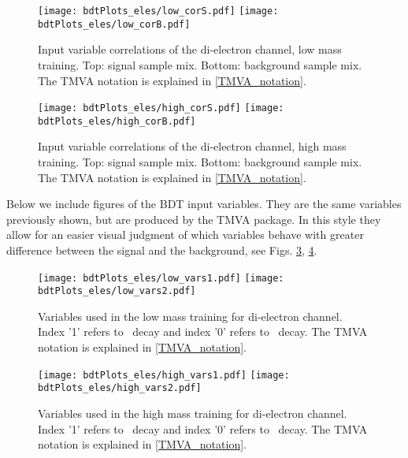 \begin{figure}[tbp]
\begin{center}
\texttt{[image: bdtPlots\_eles/low\_corS.pdf]}
\texttt{[image: bdtPlots\_eles/low\_corB.pdf]}
\caption[Input variable correlations of the di-electron channel, low mass training.]{ Input variable correlations of the di-electron channel, low mass training. Top: signal sample mix. Bottom: background sample mix. The TMVA notation is explained in \ref{TMVA_notation}.}
\label{fig:ele_cors_low}
\end{center}
\end{figure}

\begin{figure}[tbp]
\begin{center}
\texttt{[image: bdtPlots\_eles/high\_corS.pdf]}
\texttt{[image: bdtPlots\_eles/high\_corB.pdf]}
\caption[Input variable correlations of the di-electron channel, high mass training.]{ Input variable correlations of the di-electron channel, high mass training. Top: signal sample mix. Bottom: background sample mix. The TMVA notation is explained in \ref{TMVA_notation}.}
\label{fig:ele_cors_high}
\end{center}
\end{figure}

Below we include figures of the BDT input variables. They are the same variables previously shown, but are produced by the TMVA package. In this style they allow for an easier visual judgment of which variables behave with greater difference between the signal and the background, see Figs. \ref{fig:ele_lowVars}, \ref{fig:ele_highVars}.

\begin{figure}[H]
\begin{center}
\texttt{[image: bdtPlots\_eles/low\_vars1.pdf]}
\texttt{[image: bdtPlots\_eles/low\_vars2.pdf]}
\caption[Variables used in the low mass training for di-electron channel.]{ Variables used in the low mass training for di-electron channel. Index '1' refers to \HBB~decay and index '0' refers to \HZZ~decay. The TMVA notation is explained in \ref{TMVA_notation}.}
\label{fig:ele_lowVars}
\end{center}
\end{figure}

\begin{figure}[H]
\begin{center}
\texttt{[image: bdtPlots\_eles/high\_vars1.pdf]}
\texttt{[image: bdtPlots\_eles/high\_vars2.pdf]}
\caption[Variables used in the high mass training for di-electron channel.]{ Variables used in the high mass training for di-electron channel. Index '1' refers to \HBB~decay and index '0' refers to \HZZ~decay. The TMVA notation is explained in \ref{TMVA_notation}.}
\label{fig:ele_highVars}
\end{center}
\end{figure}

